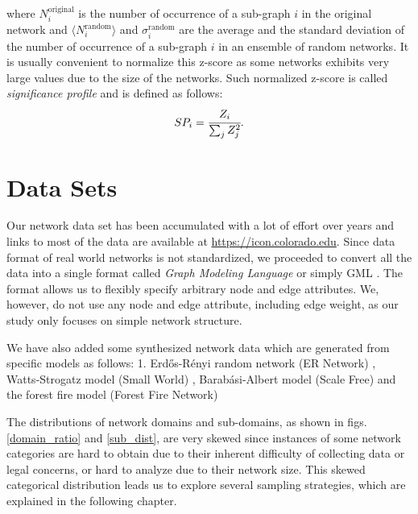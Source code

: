 \documentclass{article}
\begin{document}
where $N_i^{\text{original}}$ is the number of occurrence of a sub-graph $i$ in the original network and $ \langle N_i^{\text{random}} \rangle$ and $\sigma_i^{\text{random}}$ are the average and the standard deviation of the number of occurrence of a sub-graph $i$ in an ensemble of random networks. It is usually convenient to normalize this z-score as some networks exhibits very large values due to the size of the networks. Such normalized z-score is called \textit{significance profile} and is defined as follows:
	\begin{equation}
	SP_i = \cfrac{Z_i}{\sum_j Z_j^2}.
	\end{equation}
	
\section{Data Sets}
	
	Our network data set has been accumulated with a lot of effort over years and links to most of the data are available at \url{https://icon.colorado.edu}.
	Since data format of real world networks is not standardized, we proceeded to convert all the data into a single format called \textit{Graph Modeling Language} or simply GML \cite{GML}. The format allows us to flexibly specify arbitrary node and edge attributes. We, however, do not use any node and edge attribute, including edge weight, as our study only focuses on simple network structure.
	
	We have also added some synthesized network data which are generated from specific models as follows: 1. Erd\H{o}s-R\'enyi random network (ER Network) \cite{ER_Network}, Watts-Strogatz model (Small World) \cite{watts1998cds}, Barab\'asi-Albert model (Scale Free) \cite{Barabasi99emergenceScaling} and the forest fire model (Forest Fire Network) \cite{ForestFire}
	
	The distributions of network domains and sub-domains, as shown in figs.\ref{domain_ratio} and \ref{sub_dist}, are very skewed since instances of some network categories are hard to obtain due to their inherent difficulty of collecting data or legal concerns, or hard to analyze due to their network size. This skewed categorical distribution leads us to explore several sampling strategies, which are explained in the following chapter.
	
\end{document}
